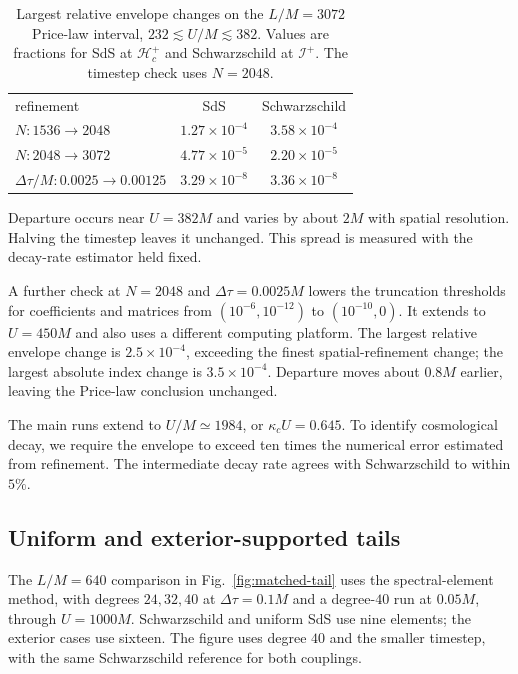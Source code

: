 \documentclass[
 aps,
 prd,
 reprint,
 superscriptaddress,
 nofootinbib,
 longbibliography
]{revtex4-2}
\newcommand{\scri}{\mathscr{I}}
\newcommand{\hc}{\mathcal{H}_{c}^{+}}
\begin{document}
\begin{table}[t]
 \caption{Largest relative envelope changes on the $L/M=3072$ Price-law
 interval, $232\lesssim U/M\lesssim382$.  Values are fractions for SdS at
 $\hc$ and Schwarzschild at $\scri^+$.  The timestep check uses $N=2048$.}
 \label{tab:large-L-tail-convergence}
 \begin{ruledtabular}
 \begin{tabular}{lcc}
 refinement & SdS & Schwarzschild\\
 \colrule
 $N:1536\to2048$ & $1.27\times10^{-4}$ & $3.58\times10^{-4}$\\
 $N:2048\to3072$ & $4.77\times10^{-5}$ & $2.20\times10^{-5}$\\
 $\Delta\tau/M:0.0025\to0.00125$ & $3.29\times10^{-8}$ & $3.36\times10^{-8}$\\
 \end{tabular}
 \end{ruledtabular}
\end{table}

Departure occurs near $U=382M$ and varies by about $2M$ with spatial
resolution.  Halving the timestep leaves it unchanged.  This spread is
measured with the decay-rate estimator held fixed.

A further check at $N=2048$ and $\Delta\tau=0.0025M$ lowers the truncation
thresholds for coefficients and matrices from $(10^{-6},10^{-12})$ to
$(10^{-10},0)$.  It extends to $U=450M$ and also uses a different computing
platform.  The largest relative envelope change is $2.5\times10^{-4}$,
exceeding the finest spatial-refinement change; the largest absolute index
change is $3.5\times10^{-4}$.  Departure moves about $0.8M$ earlier, leaving
the Price-law conclusion unchanged.

The main runs extend to $U/M\simeq1984$, or $\kappa_cU=0.645$.  To identify
cosmological decay, we require the envelope to exceed ten times the
numerical error estimated from refinement. The
intermediate decay rate agrees with Schwarzschild to within $5\%$.

\subsection{Uniform and exterior-supported tails}
\label{app:matched-tail-protocol}

The $L/M=640$ comparison in Fig.~\ref{fig:matched-tail} uses the
spectral-element method, with degrees
$24,32,40$ at $\Delta\tau=0.1M$ and a degree-$40$ run at $0.05M$, through
$U=1000M$.  Schwarzschild and uniform SdS use nine elements; the exterior
cases use sixteen.  The figure uses degree $40$ and the smaller timestep,
with the same Schwarzschild reference for both couplings.
\end{document}
